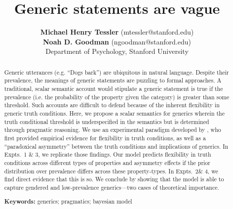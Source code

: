 \documentclass[10pt,letterpaper]{article}
\title{Generic statements are vague}
\author{{\large \bf Michael Henry Tessler} (mtessler@stanford.edu)\\ {\large \bf Noah D. Goodman} (ngoodman@stanford.edu) \\
  Department of Psychology, Stanford University}
\begin{document}
\maketitle


\begin{abstract}
Generic utterances (e.g. ``Dogs bark'') are ubiquitous in natural language. Despite their prevalence, the meanings of generic statements are puzzling to formal approaches. A traditional, scalar semantic account would stipulate a generic statement is true if the prevalence (i.e. the probability of the property given the category) is greater than some threshold. Such accounts are difficult to defend because of the inherent flexibility in generic truth conditions. Here, we propose a scalar semantics for generics wherein the truth conditional threshold is underspecified in the semantics but is determined through pragmatic reasoning. 
We use an experimental paradigm developed by , who first provided empirical evidence for flexibility in truth conditions, as well as a ``paradoxical asymmetry'' between the truth conditions and implications of generics. In Expts.~1 \& 3, we replicate those findings. Our model predicts flexibility in truth conditions across different types of properties and asymmetry effects if the prior distribution over prevalence differs across these property-types.  In Expts.~2\& 4, we find direct evidence that this is so. We conclude by showing that the model is able to capture gendered and low-prevalence generics---two cases of theoretical importance.




\textbf{Keywords:} 
generics; pragmatics; bayesian model
\end{abstract}
\end{document}
